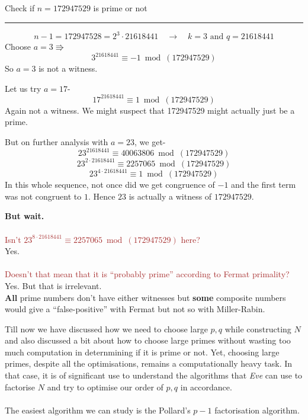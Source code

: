 			\begin{tcolorbox}[breakable, title=Illustration,colback=brown!5!white,colframe=brown!75!black,colbacktitle=yellow!50!red,coltitle=red!25!black,fonttitle=\bfseries,subtitle style={boxrule=0.4pt,colback=yellow!50!red!25!white} ]
				Check if \(n= 172947529\) is prime or not\vspace{0.5cm}
				\hrule
				\vspace{0.5cm}
				\[n-1=172947528=2^3\cdot21618441\quad\rightarrow\quad k=3\text{ and }q=21618441\]
				Choose \(a=3\Rrightarrow\)
				\[3^{21618441}\equiv -1 \bmod(172947529)\]
				So \(a=3\) is not a witness.

				Let us try $a=17$-
				\[17^{21618441}\equiv 1 \bmod(172947529)\]
				Again not a witness. We might suspect that 172947529 might actually just be a prime.

				But on further analysis with \(a=23\), we get-
				\[23^{21618441}\equiv40063806\bmod(172947529)\]
				\[23^{2\cdot 21618441}\equiv 2257065\bmod(172947529)\]
				\[23^{4\cdot 21618441}\equiv 1\bmod(172947529)\]
				In this whole sequence, not once did we get congruence of \(-1\) and the first term was not congruent to $1$. Hence $23$ is actually a witness of $172947529$.\par
				\textbf{But wait.} \\~\\ \textcolor{brown}{Isn't \(23^{8\cdot 21618441}\equiv 2257065\bmod(172947529)\) here?}\\Yes.\\~\\\textcolor{brown}{Doesn't that mean that it is ``probably prime'' according to Fermat primality?}\\Yes. But that is irrelevant. \\\textbf{All} prime numbers don't have either witnesses but \textbf{some} composite numbers would give a ``false-positive'' with Fermat but not so with Miller-Rabin.

			\end{tcolorbox}

		Till now we have discussed how we need to choose large \(p,q\) while constructing \(N\) and also discussed a bit about how to choose large primes without wasting too much computation in deternmining if it is prime or not. Yet, choosing large primes, despite all the optimisations, remains a computationally heavy task. In that case, it is of significant use to understand the algorithms that \emph{Eve} can use to factorise $N$ and try to optimise our order of $p,q$ in accordance.\\~\\
		The easiest algorithm we can study is the Pollard's \(p-1\) factorisation algorithm.

